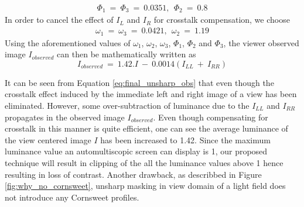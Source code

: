 \begin{equation}
\begin{aligned}
\Phi_1\:=\: \Phi_3\:=\: 0.0351,\:\: \Phi_2\:=\:0.8
\end{aligned}
\end{equation}
In order to cancel the effect of $I_L$ and $I_R$ for crosstalk compensation, we choose
\begin{equation}
\begin{aligned}
\omega_1\:=\: \omega_3\:=\: 0.0421,\:\: \omega_2\:=\:1.19
\end{aligned}
\end{equation}
Using the aforementioned values of $\omega_1$, $\omega_2$, $\omega_3$, $\Phi_1$, $\Phi_2$ and $\Phi_3$, the viewer observed image $I_{observed}$ can then be mathematically written as
\begin{equation}
I_{observed}\: =\:  1.42.I\:-\: 0.0014(I_{LL}\:+\:I_{RR})
\label{eq:final_unsharp_obs}
\end{equation}

It can be seen from Equation \ref{eq:final_unsharp_obs} that even though the crosstalk effect induced by the immediate left and right image of a view has been eliminated. However, some over-subtraction of luminance due to the $I_{LL}$ and $I_{RR}$ propagates in the observed image $I_{observed}$. Even though compensating for crosstalk in this manner is quite efficient, one can see the average luminance of the view centered image $I$ has been increased to 1.42. Since the maximum luminance value an automultiscopic screen can display is 1, our proposed technique will result in clipping of the all the luminance values above 1 hence resulting in loss of contrast. Another drawback, as describbed in Figure \ref{fig:why_no_cornsweet}, unsharp masking in view domain of a light field does not introduce any Cornsweet profiles.

